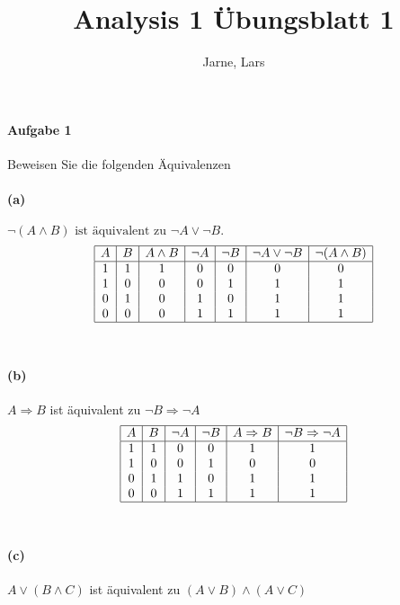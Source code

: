 \documentclass[12pt, letterpaper]{article}
\title{Analysis 1 Übungsblatt 1}
\author{Jarne, Lars}
\date{}
\begin{document}
\maketitle 

\paragraph{Aufgabe 1}

\noindent Beweisen Sie die folgenden Äquivalenzen

\paragraph{(a)} $\neg (A \land B) \text{ ist äquivalent zu } \neg A \lor \neg B.$\\

\[
\begin{array}{|c|c|c|c|c|c|c|}
\hline
A & B & A \land B & \neg A & \neg B & \neg A \lor \neg B & \neg(A \land B) \\
\hline
1 & 1 & 1 & 0 & 0 & 0 & 0 \\
1 & 0 & 0 & 0 & 1 & 1 & 1 \\
0 & 1 & 0 & 1 & 0 & 1 & 1 \\
0 & 0 & 0 & 1 & 1 & 1 & 1 \\
\hline
\end{array}
\]\\

\paragraph{(b)} $A \Rightarrow B$ ist äquivalent zu $\neg B \Rightarrow \neg A$\\

\[
\begin{array}{|c|c|c|c|c|c|}
\hline
A & B & \neg A & \neg B & A \Rightarrow B & \neg B \Rightarrow \neg A \\
\hline
1 & 1 & 0 & 0 & 1 & 1 \\
1 & 0 & 0 & 1 & 0 & 0 \\
0 & 1 & 1 & 0 & 1 & 1 \\
0 & 0 & 1 & 1 & 1 & 1 \\
\hline
\end{array}
\]\\

\paragraph{(c)} $A \lor (B \land C)$ ist äquivalent zu $(A \lor B) \land (A \lor C)$\\
\end{document}
